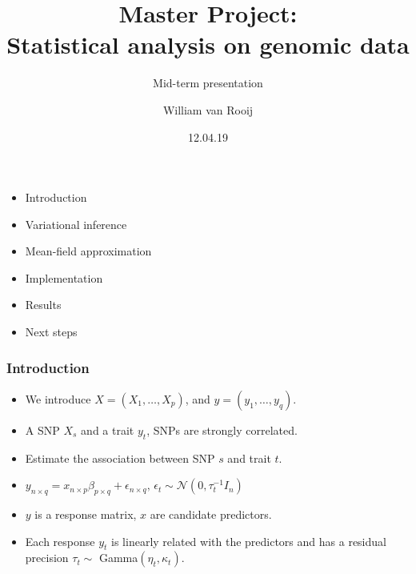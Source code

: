 \documentclass{beamer}
\begin{document}
\title{Master Project:\\Statistical analysis on genomic data}
\subtitle{Mid-term presentation}
\author{William van Rooij}
\date{12.04.19}
\maketitle
\begin{frame}
\begin{itemize}
\item Introduction
\item Variational inference
\item Mean-field approximation
\item Implementation
\item Results
\item Next steps
\end{itemize}
\end{frame}
\begin{frame}
\frametitle{Introduction}
\begin{itemize}
\item We introduce $X = (X_1,\ldots,X_p)$, and $y = (y_1,\ldots,y_q)$.
\item A SNP $X_s$ and a trait $y_t$, SNPs are strongly correlated.
\item Estimate the association between SNP $s$ and trait $t$.
\item $y_{n\times q} = x_{n\times p}\beta_{p \times q} + \epsilon_{n\times q}\text{, }\epsilon_t \sim \mathcal{N}(0,\tau_t^{-1}I_n)$
\item $y$ is a response matrix, $x$ are candidate predictors.

\item Each response $y_t$ is linearly related with the predictors and has a residual precision $\tau_t \sim $ Gamma$(\eta_t, \kappa_t)$.

\end{itemize}
\end{frame}
\end{document}
